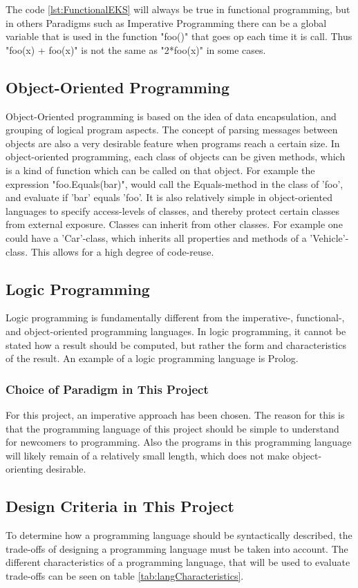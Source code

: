 The code \ref{lst:FunctionalEKS} will always be true in functional programming, but in others Paradigms such as Imperative Programming there can be a global variable that is used in the function "foo()" that goes op each time it is call. Thus "foo(x) + foo(x)" is not the same as "2*foo(x)" in some cases.
\subsection{Object-Oriented Programming}
Object-Oriented programming is based on the idea of data encapsulation, and grouping of logical program aspects. The concept of parsing messages between objects are also a very desirable feature when programs reach a certain size. In object-oriented programming, each class of objects can be given methods, which is a kind of function which can be called on that object. For example the expression "foo.Equals(bar)", would call the Equals-method in the class of 'foo', and evaluate if 'bar' equals 'foo'. It is also relatively simple in object-oriented languages to specify access-levels of classes, and thereby protect certain classes from external exposure. Classes can inherit from other classes. For example one could have a 'Car'-class, which inherits all properties and methods of a 'Vehicle'-class. This allows for a high degree of code-reuse.

\subsection{Logic Programming}
Logic programming is fundamentally different from the imperative-, functional-, and object-oriented programming languages. In logic programming, it cannot be stated how a result should be computed, but rather the form and characteristics of the result. An example of a logic programming language is Prolog.

\subsubsection{Choice of Paradigm in This Project}
For this project, an imperative approach has been chosen. The reason for this is that the programming language of this project should be simple to understand for newcomers to programming. Also the programs in this programming language will likely remain of a relatively small length, which does not make object-orienting desirable.

\subsection{Design Criteria in This Project}
To determine how a programming language should be syntactically described, the trade-offs of designing a programming language must be taken into account. The different characteristics of a programming language, that will be used to evaluate trade-offs can be seen on table \ref{tab:langCharacteristics}.

